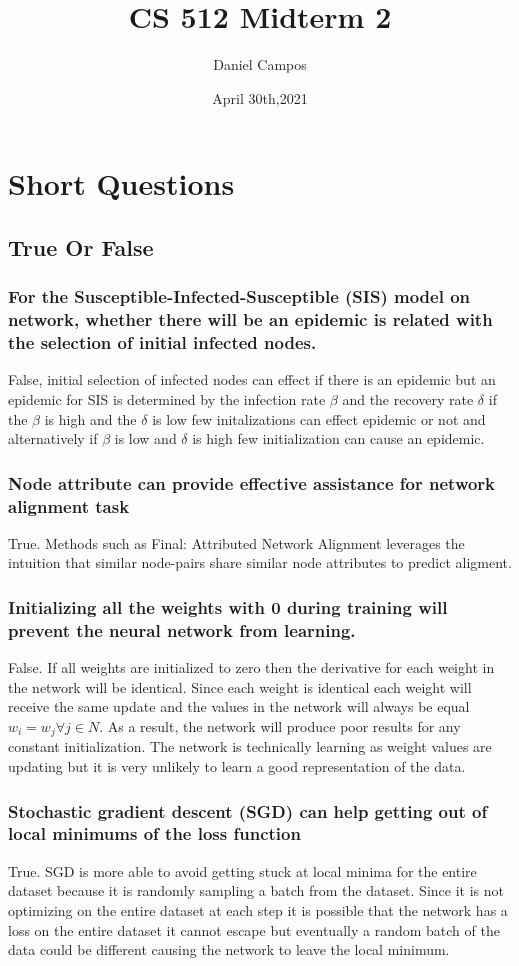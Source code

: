 \documentclass[11pt]{article}
\title{CS 512 Midterm 2}
\author{Daniel Campos}
\date{April 30th,2021}
\begin{document}
\maketitle
\section{Short Questions}
\subsection{True Or False}
\subsubsection{For the Susceptible-Infected-Susceptible (SIS) model on network, whether there will be an epidemic is related with the selection of initial infected nodes.}
False, initial selection of infected nodes can effect if there is an epidemic but an epidemic for SIS is determined by the infection rate $\beta$ and the recovery rate $\delta$ if the $\beta$ is high and the $\delta$ is low few initalizations can effect epidemic or not and alternatively if $\beta$ is low and $\delta$ is high few initialization can cause an epidemic.
\subsubsection{Node attribute can provide effective assistance for network alignment task}
True. Methods such as Final: Attributed Network Alignment leverages the intuition that similar node-pairs share similar node attributes to predict aligment.
\subsubsection{Initializing all the weights with 0 during training will prevent the neural network from learning.}
False. If all weights are initialized to zero then the derivative for each weight in the network will be identical. Since each weight is identical each weight will receive the same update and the values in the network will always be equal $w_i = w_j \forall j \in N$. As a result, the network will produce poor results for any constant initialization. The network is technically learning as weight values are updating but it is very unlikely to learn a good representation of the data. 
\subsubsection{Stochastic gradient descent (SGD) can help getting out of local minimums of the loss function}
True. SGD is more able to avoid getting stuck at local minima for the entire dataset because it is randomly sampling a batch from the dataset. Since it is not optimizing on the entire dataset at each step it is possible that the network has a loss on the entire dataset it cannot escape but eventually a random batch of the data could be different causing the network to leave the local minimum.
\end{document}
